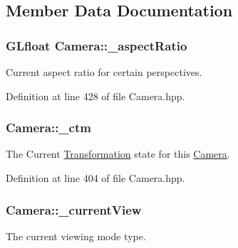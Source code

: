 \subsection{Member Data Documentation}
\hypertarget{class_camera_a42082e8f2d80a13674ce163d8e720bfb}{
\subsubsection[{\-\_\-aspect\-Ratio}]{\setlength{\rightskip}{0pt plus 5cm}G\-Lfloat Camera\-::\-\_\-aspect\-Ratio\hspace{0.3cm}{\ttfamily [private]}}}\label{class_camera_a42082e8f2d80a13674ce163d8e720bfb}


Current aspect ratio for certain perspectives. 



Definition at line 428 of file Camera.\-hpp.

\hypertarget{class_camera_a6c1e31c8470b923f9f872f73597cb95b}{
\subsubsection[{\-\_\-ctm}]{ Camera\-::\-\_\-ctm\hspace{0.3cm}{\ttfamily [private]}}}\label{class_camera_a6c1e31c8470b923f9f872f73597cb95b}


The Current \hyperlink{class_transformation}{Transformation} state for this \hyperlink{class_camera}{Camera}. 



Definition at line 404 of file Camera.\-hpp.

\hypertarget{class_camera_ac9062d9bb891aa81d163076738451081}{
\subsubsection[{\-\_\-current\-View}]{ Camera\-::\-\_\-current\-View\hspace{0.3cm}{\ttfamily [private]}}}\label{class_camera_ac9062d9bb891aa81d163076738451081}


The current viewing mode type. 



